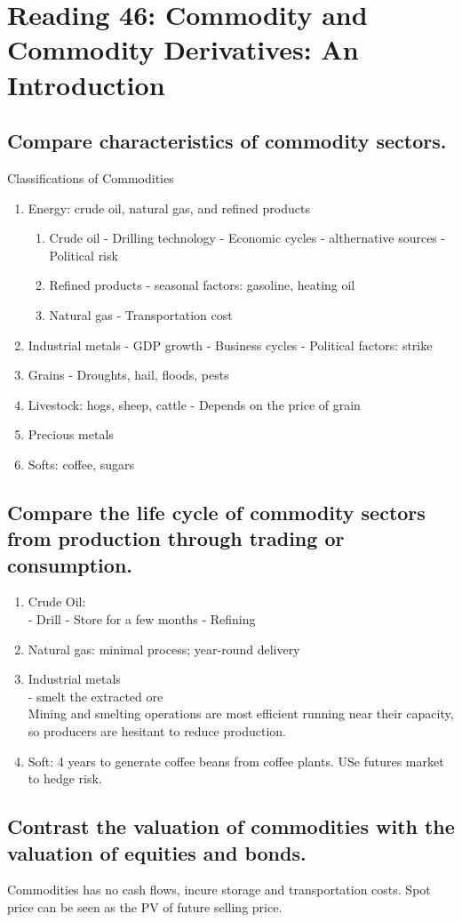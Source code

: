 \documentclass{article}
\newcommand{\be}{\begin{enumerate}}
\newcommand{\ee}{\end{enumerate}}
\begin{document}
\section{Reading 46: Commodity and Commodity Derivatives: An Introduction}
\subsection{Compare characteristics of commodity sectors.}
Classifications of Commodities
\be
    \item Energy: crude oil, natural gas, and refined products
        \be
            \item Crude oil
                - Drilling technology
                - Economic cycles
                - althernative sources
                - Political risk
            \item Refined products
                - seasonal factors: gasoline, heating oil
            \item Natural gas
                - Transportation cost
        \ee
    \item Industrial metals
        - GDP growth
        - Business cycles
        - Political factors: strike
    \item Grains
        - Droughts, hail, floods, pests
    \item Livestock: hogs, sheep, cattle
        - Depends on the price of grain
    \item Precious metals
    \item Softs: coffee, sugars
\ee 
\subsection{Compare the life cycle of commodity sectors from production
through trading or consumption.}
\be
    \item Crude Oil:
        \\- Drill - Store for a few months - Refining
    \item Natural gas: minimal process; year-round delivery
    \item Industrial metals
        \\ - smelt the extracted ore
        \\ Mining and smelting operations are most efficient running near their
        capacity, so producers are hesitant to reduce production.
    \item Soft: 4 years to generate coffee beans from coffee plants. USe futures market
    to hedge risk.
\ee
\subsection{Contrast the valuation of commodities with the valuation of equities and bonds.}
Commodities has no cash flows, incure storage and transportation costs.
Spot price can be seen as the PV of future selling price.
\end{document}
